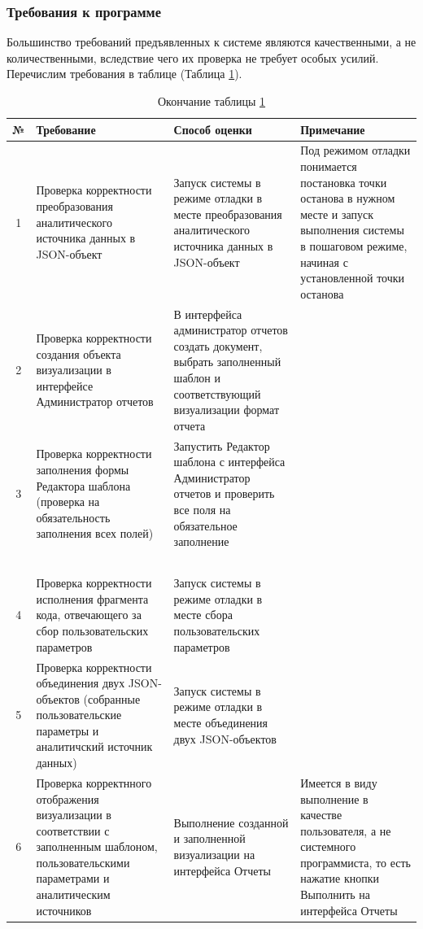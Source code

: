\documentclass[a4paper]{extarticle}
\numberwithin{equation}{section}
\begin{document}
\subsubsection{Требования к программе}
Большинство требований предъявленных к системе являются качественными, а не количественными, вследствие чего их проверка не требует особых усилий. Перечислим требования в таблице (Таблица \ref{tableTreb}).\par
\begin{longtable}[H]{|c|p{}|p{}|p{}|}
  \caption{Требования к программе}
  \label{tableTreb}\\
  \hline
  №  & Требование & Способ оценки & Примечание \\\hline
  \endfirsthead
  1  & Проверка корректности преобразования аналитического источника данных в JSON-объект & Запуск системы в режиме отладки в месте преобразования аналитического источника данных в JSON-объект & Под режимом отладки понимается постановка точки останова в нужном месте и запуск выполнения системы в пошаговом режиме, начиная с установленной точки останова\\\hline
  2  & Проверка корректности создания объекта визуализации в интерфейсе Администратор отчетов & В интерфейса администратор отчетов создать документ, выбрать заполненный шаблон и соответствующий визуализации формат отчета & \\\hline
  3  & Проверка корректности заполнения формы Редактора шаблона (проверка на обязательность заполнения всех полей) & Запустить Редактор шаблона с интерфейса Администратор отчетов и проверить все поля на обязательное заполнение & \\
  \multicolumn{4}{l}{}\\\multicolumn{4}{l}{}\\\multicolumn{4}{l}{}\\\multicolumn{4}{l}{}\\
  \caption*{Окончание таблицы \ref{tableTreb}} \\\hline
  4  & Проверка корректности исполнения фрагмента кода, отвечающего за сбор пользовательских параметров & Запуск системы в режиме отладки в месте сбора пользовательских параметров & \\\hline
  5  & Проверка корректности объединения двух JSON-объектов (собранные пользовательские параметры и аналитичский источник данных) & Запуск системы в режиме отладки в месте объединения двух JSON-объектов & \\\hline
  6  & Проверка корректнного отображения визуализации в соответствии с заполненным шаблоном, пользовательскими параметрами и аналитическим источников & Выполнение созданной и заполненной визуализации на интерфейса Отчеты & Имеется в виду выполнение в качестве пользователя, а не системного программиста, то есть нажатие кнопки Выполнить на интерфейса Отчеты\\\hline
\end{longtable}\par
\end{document}
